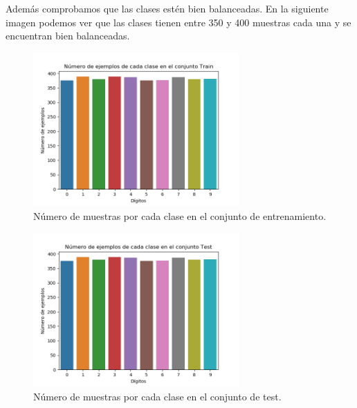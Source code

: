\documentclass[size=a4, parskip=half, titlepage=false, toc=flat, toc=bib, 12pt]{scrartcl}
\begin{document}
Además comprobamos que las clases estén bien balanceadas. En la siguiente imagen podemos ver que las clases tienen entre 350 y 400 muestras cada una y se encuentran bien balanceadas.
\begin{figure}[H]
\centering
\includegraphics[width=0.7\textwidth]{./img/clasestrain}
\caption{Número de muestras por cada clase en el conjunto de entrenamiento.}
\end{figure}
\begin{figure}[H]
\centering
\includegraphics[width=0.7\textwidth]{./img/clasestest}
\caption{Número de muestras por cada clase en el conjunto de test.}
\end{figure}
\end{document}
